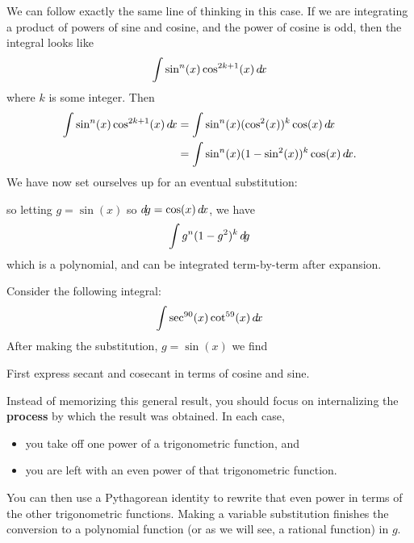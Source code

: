 \documentclass{ximera}
\begin{document}
We can follow exactly the same line of thinking in this case. If we
are integrating a product of powers of sine and cosine, and the power
of cosine is odd, then the integral looks like
\[
\int \sin^n(x) \cos^{2k+1}(x) \mathop{}\!d\! x
\]
where $k$ is some integer. Then
\begin{align*}
\int \sin^n(x) \cos^{2k+1}(x) \mathop{}\!d\! x &=\int \sin^n(x) (\cos^{2}(x))^k \cos(x)\mathop{}\!d\! x\\
&= \int \sin^n(x) (1-\sin^{2}(x))^k \cos(x) \mathop{}\!d\! x.
\end{align*}
We have now set ourselves up for an eventual substitution:
\begin{center}%
\end{center}
so letting $g = \sin(x)$ so $\mathop{}\!d\! g =\cos(x) \mathop{}\!d\! x$, we have 
\[
\int g^n(1-g^2)^k \mathop{}\!d\! g
\]
which is a polynomial, and can be integrated term-by-term after
expansion.

\begin{question}
  Consider the following integral:
  \[
  \int \sec^{90}(x) \cot^{59}(x)  \mathop{}\!d\! x
  \]
  After making the substitution, $g = \sin(x)$ we find
  \begin{hint}
    First express secant and cosecant in terms of cosine and sine.
  \end{hint}
  \begin{multipleChoice}
  \end{multipleChoice}
\end{question}


\begin{warning}
Instead of memorizing this general result, you should focus on
internalizing the \textbf{process} by which the result was obtained.
In each case,
\begin{itemize}
\item you take off one power of a trigonometric function, and
\item you are left with an even power of that trigonometric
  function.
\end{itemize}
You can then use a Pythagorean identity to rewrite that even power in
terms of the other trigonometric functions.  Making a variable
substitution finishes the conversion to a polynomial function (or as
we will see, a rational function) in $g$.
\end{warning}
\end{document}
